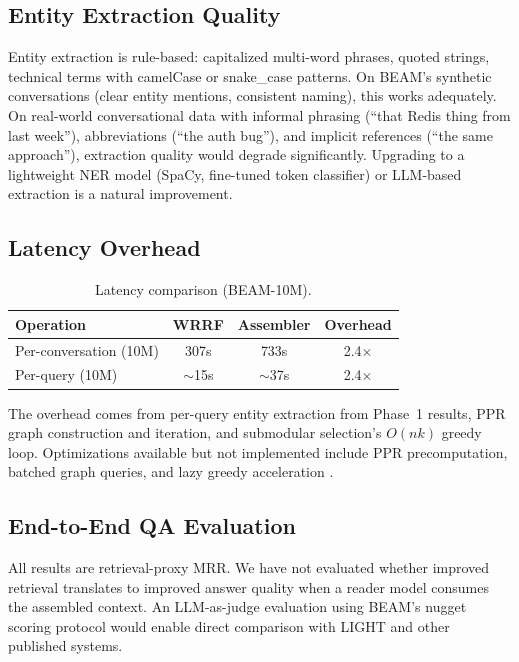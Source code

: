 \documentclass[11pt]{article}
\begin{document}
\subsection{Entity Extraction Quality}

Entity extraction is rule-based: capitalized multi-word phrases,
quoted strings, technical terms with camelCase or snake\_case
patterns.  On BEAM's synthetic conversations (clear entity mentions,
consistent naming), this works adequately.  On real-world
conversational data with informal phrasing (``that Redis thing from
last week''), abbreviations (``the auth bug''), and implicit
references (``the same approach''), extraction quality would degrade
significantly.  Upgrading to a lightweight NER model (SpaCy,
fine-tuned token classifier) or LLM-based extraction is a natural
improvement.

\subsection{Latency Overhead}

\begin{table}[h]
\centering
\caption{Latency comparison (BEAM-10M).}
\label{tab:latency}
\begin{tabular}{lccc}
\toprule
Operation & WRRF & Assembler & Overhead \\
\midrule
Per-conversation (10M) & 307s & 733s & 2.4$\times$ \\
Per-query (10M) & $\sim$15s & $\sim$37s & 2.4$\times$ \\
\bottomrule
\end{tabular}
\end{table}

The overhead comes from per-query entity extraction from Phase~1
results, PPR graph construction and iteration, and submodular
selection's $O(nk)$ greedy loop.  Optimizations available but not
implemented include PPR precomputation, batched graph queries, and
lazy greedy acceleration \citep{Minoux1978}.

\subsection{End-to-End QA Evaluation}

All results are retrieval-proxy MRR.  We have not evaluated whether
improved retrieval translates to improved answer quality when a reader
model consumes the assembled context.  An LLM-as-judge evaluation
using BEAM's nugget scoring protocol would enable direct comparison
with LIGHT and other published systems.
\end{document}
